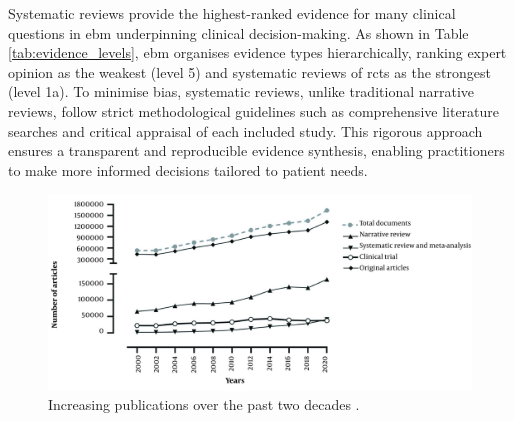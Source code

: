 \documentclass[10pt,oneside]{book}
\begin{document}
Systematic reviews provide the highest-ranked evidence for many clinical questions in \gls*{ebm} underpinning clinical decision-making. As shown in Table \ref{tab:evidence_levels}, \gls*{ebm} organises evidence types hierarchically, ranking expert opinion as the weakest (level 5) and systematic reviews of \glspl*{rct} as the strongest (level 1a). To minimise bias, systematic reviews, unlike traditional narrative reviews, follow strict methodological guidelines such as comprehensive literature searches and critical appraisal of each included study. This rigorous approach ensures a transparent and reproducible evidence synthesis, enabling practitioners to make more informed decisions tailored to patient needs.



\begin{figure}
    \centering
    \includegraphics[width=1\linewidth]{Confirmation Review/images/increase_in_publications.jpg}
    \caption{Increasing publications over the past two decades \cite{ghasemi_scientific_2022}.\protect\footnotemark}
    \label{fig:increasing_publications_over_time}
\end{figure}
\end{document}
